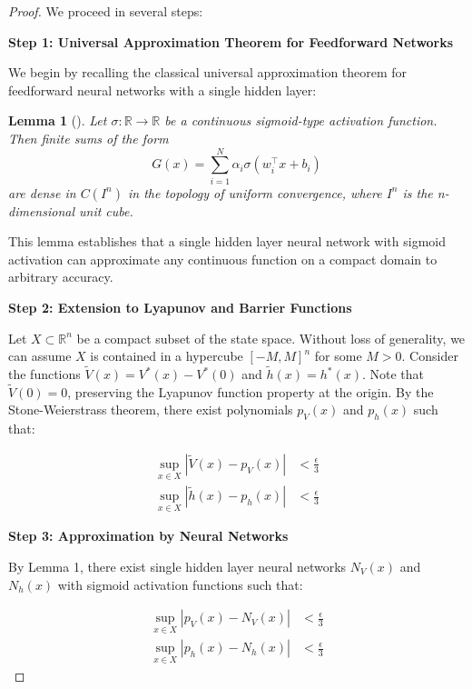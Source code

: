 \documentclass[11pt, oneside]{article}
\newtheorem{lemma}[theorem]{Lemma}
\begin{document}
\begin{proof}
We proceed in several steps:

\textbf{Step 1: Universal Approximation Theorem for Feedforward Networks}

We begin by recalling the classical universal approximation theorem for feedforward neural networks with a single hidden layer:

\begin{lemma}[\cite{cybenko1989approximation}]
Let $\sigma: \mathbb{R} \to \mathbb{R}$ be a continuous sigmoid-type activation function. Then finite sums of the form
\begin{equation}
    G(x) = \sum_{i=1}^N \alpha_i \sigma(w_i^\top x + b_i)
\end{equation}
are dense in $C(I^n)$ in the topology of uniform convergence, where $I^n$ is the n-dimensional unit cube.
\end{lemma}
%
This lemma establishes that a single hidden layer neural network with sigmoid activation can approximate any continuous function on a compact domain to arbitrary accuracy.

\textbf{Step 2: Extension to Lyapunov and Barrier Functions}

Let $X \subset \mathbb{R}^n$ be a compact subset of the state space. Without loss of generality, we can assume $X$ is contained in a hypercube $[-M, M]^n$ for some $M > 0$. Consider the functions $\tilde{V}(x) = V^*(x) - V^*(0)$ and $\tilde{h}(x) = h^*(x)$. Note that $\tilde{V}(0) = 0$, preserving the Lyapunov function property at the origin. By the Stone-Weierstrass theorem, there exist polynomials $p_V(x)$ and $p_h(x)$ such that:

\begin{align}
    \sup_{x \in X} |\tilde{V}(x) - p_V(x)| &< \frac{\epsilon}{3} \\
    \sup_{x \in X} |\tilde{h}(x) - p_h(x)| &< \frac{\epsilon}{3}
\end{align}

\textbf{Step 3: Approximation by Neural Networks}

By Lemma 1, there exist single hidden layer neural networks $N_V(x)$ and $N_h(x)$ with sigmoid activation functions such that:

\begin{align}
    \sup_{x \in X} |p_V(x) - N_V(x)| &< \frac{\epsilon}{3} \\
    \sup_{x \in X} |p_h(x) - N_h(x)| &< \frac{\epsilon}{3}
\end{align}


\end{proof}
\end{document}
